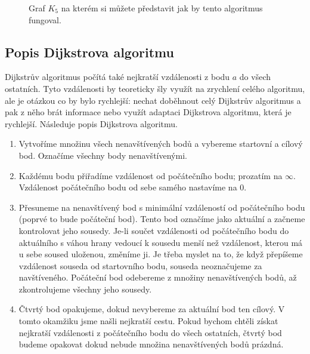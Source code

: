 \begin{figure}[H]
  \centering
  \caption{Graf $K_5$ na kterém si můžete představit jak by tento algoritmus fungoval.}
\end{figure}

\subsection{Popis Dijkstrova algoritmu}
\label{subsec:popis-algoritmu}
Dijkstrův algoritmus počítá také nejkratší vzdálenosti z bodu $a$ do všech ostatních. Tyto vzdálenosti by teoreticky šly využít na zrychlení celého algoritmu, ale je otázkou co by bylo rychlejší: nechat doběhnout celý Dijkstrův algoritmus a pak z něho brát informace nebo využít adaptaci Dijkstrova algoritmu, která je rychlejší. Následuje popis Dijkstrova algoritmu.

\begin{enumerate}
  \item Vytvoříme množinu všech nenavštívených bodů a vybereme startovní a cílový bod. Označíme všechny body nenavštívenými.
  \item Každému bodu přiřadíme vzdálenost od počátečního bodu; prozatím na $\infty$. Vzdálenost počátečního bodu od sebe samého nastavíme na $0$.
  \item Přesuneme na nenavštívený bod s minimální vzdáleností od počátečního bodu (poprvé to bude počáteční bod).
        Tento bod označíme jako aktuální a začneme kontrolovat jeho sousedy.
        Je-li součet vzdálenosti od počátečního bodu do aktuálního s váhou hrany vedoucí k sousedu menší než vzdálenost, kterou má u sebe soused uloženou, změníme ji.
        Je třeba myslet na to, že když přepíšeme vzdálenost souseda od startovního bodu, souseda neoznačujeme za navštíveného. Počáteční bod odebereme z množiny nenavštívených bodů, až zkontrolujeme všechny jeho sousedy.
  \item Čtvrtý bod opakujeme, dokud nevybereme za aktuální bod ten cílový. V tomto okamžiku jsme našli nejkratší cestu. Pokud bychom chtěli získat nejkratší vzdálenosti z počátečního bodu do všech ostatních, čtvrtý bod budeme opakovat dokud nebude množina nenavštívených bodů prázdná.
\end{enumerate}